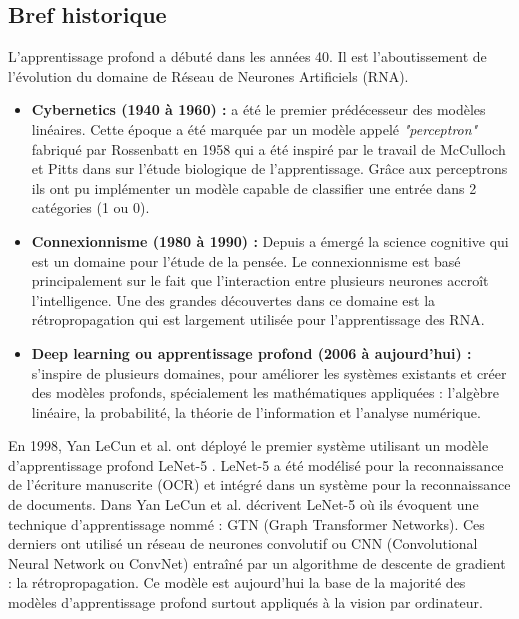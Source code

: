 \subsection{Bref historique }
L'apprentissage profond a débuté dans les années 40. Il est l'aboutissement de l'évolution du domaine de Réseau de Neurones Artificiels (RNA)\cite{Goodfellow-et-al-2016-Book}.
\begin{itemize}
	\item \textbf{Cybernetics (1940 à 1960) :} a été le premier prédécesseur des modèles linéaires. Cette époque a été marquée par un modèle appelé \textit{"perceptron"} fabriqué par Rossenbatt en 1958 \cite{rosenblatt1958perceptron} qui a été inspiré par le travail de McCulloch et Pitts dans \cite{mcculloch1943logical} sur l'étude biologique de l'apprentissage. Grâce aux perceptrons ils ont pu implémenter un modèle capable de classifier une entrée dans 2 catégories (1 ou 0).

	\item \textbf{Connexionnisme (1980 à 1990) :} Depuis a émergé la science cognitive qui est un domaine pour l'étude de la pensée. Le connexionnisme est basé principalement sur le fait que l'interaction entre plusieurs neurones accroît l'intelligence. Une des grandes découvertes dans ce domaine est la rétropropagation \cite{hecht1989theory} qui est largement utilisée pour l'apprentissage des RNA.
	\item \textbf{Deep learning ou apprentissage profond (2006 à aujourd'hui) :} s'inspire de plusieurs domaines, pour améliorer les systèmes existants et créer des modèles profonds, spécialement les mathématiques appliquées : l'algèbre linéaire, la probabilité, la théorie de l'information et l'analyse numérique.\\
\end{itemize}
En 1998, Yan LeCun et al. ont déployé le premier système utilisant un modèle d'apprentissage profond LeNet-5 \cite{lecun1998gradient}. LeNet-5 a été modélisé pour la reconnaissance de l'écriture manuscrite (OCR) et intégré dans un système pour la reconnaissance de documents. Dans \cite{lecun1998gradient} Yan LeCun et al. décrivent LeNet-5 où ils évoquent une technique d'apprentissage nommé : GTN (Graph Transformer Networks). Ces derniers ont utilisé un réseau de neurones convolutif ou CNN (Convolutional Neural Network ou ConvNet) entraîné par un algorithme de descente de gradient : la rétropropagation. Ce modèle est aujourd'hui la base de la majorité des modèles d'apprentissage profond surtout appliqués à la vision par ordinateur.\\
